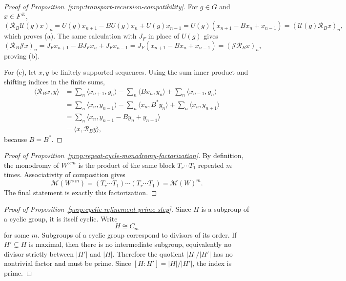 \begin{proof}[Proof of Proposition~\ref{prop:transport-recursion-compatibility}]
\label{proof:prop:transport-recursion-compatibility}
For $g\in G$ and $x\in F^{\mathbb{Z}}$,
\[
(\mathcal R_B\mathcal U(g)x)_n
=
U(g)x_{n+1}-BU(g)x_n+U(g)x_{n-1}
=
U(g)(x_{n+1}-Bx_n+x_{n-1})
=
(\mathcal U(g)\mathcal R_Bx)_n,
\]
which proves (a). The same calculation with $J_F$ in place of $U(g)$ gives
\[
(\mathcal R_B\mathcal Jx)_n
=
J_Fx_{n+1}-BJ_Fx_n+J_Fx_{n-1}
=
J_F(x_{n+1}-Bx_n+x_{n-1})
=
(\mathcal J\mathcal R_Bx)_n,
\]
proving (b).

For (c), let $x,y$ be finitely supported sequences. Using the sum inner
product and shifting indices in the finite sums,
\begin{align*}
\langle \mathcal R_Bx,y\rangle
&=
\sum_n \langle x_{n+1},y_n\rangle
-\sum_n \langle Bx_n,y_n\rangle
+\sum_n \langle x_{n-1},y_n\rangle \\
&=
\sum_n \langle x_n,y_{n-1}\rangle
-\sum_n \langle x_n,B^*y_n\rangle
+\sum_n \langle x_n,y_{n+1}\rangle \\
&=
\sum_n \langle x_n,y_{n-1}-By_n+y_{n+1}\rangle \\
&=
\langle x,\mathcal R_By\rangle,
\end{align*}
because $B=B^*$.
\end{proof}

\begin{proof}[Proof of Proposition~\ref{prop:repeat-cycle-monodromy-factorization}]
\label{proof:prop:repeat-cycle-monodromy-factorization}
By definition, the monodromy of \(W^{\times m}\) is the product of the same
block \(T_r\cdots T_1\) repeated \(m\) times. Associativity of composition gives
\[
\mathcal M(W^{\times m})
=
(T_r\cdots T_1)\cdots(T_r\cdots T_1)
=
\mathcal M(W)^m.
\]
The final statement is exactly this factorization.
\end{proof}

\begin{proof}[Proof of Proposition~\ref{prop:cyclic-refinement-prime-step}]
\label{proof:prop:cyclic-refinement-prime-step}
Since \(H\) is a subgroup of a cyclic group, it is itself cyclic. Write
\[
H\cong C_m
\]
for some \(m\). Subgroups of a cyclic group correspond to divisors of its
order. If \(H'\subsetneq H\) is maximal, then there is no intermediate
subgroup, equivalently no divisor strictly between \(|H'|\) and \(|H|\).
Therefore the quotient \(|H|/|H'|\) has no nontrivial factor and must be
prime. Since \([H:H']=|H|/|H'|\), the index is prime.
\end{proof}

